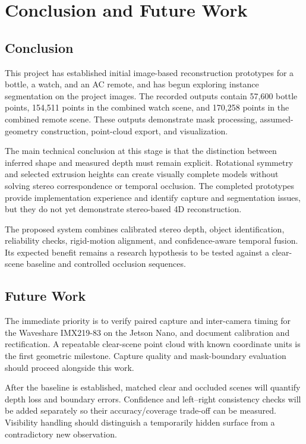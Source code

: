 \chapter{Conclusion and Future Work}
\section{Conclusion}
This project has established initial image-based reconstruction prototypes for a bottle, a watch, and an AC remote, and has begun exploring instance segmentation on the project images. The recorded outputs contain 57,600 bottle points, 154,511 points in the combined watch scene, and 170,258 points in the combined remote scene. These outputs demonstrate mask processing, assumed-geometry construction, point-cloud export, and visualization.

The main technical conclusion at this stage is that the distinction between inferred shape and measured depth must remain explicit. Rotational symmetry and selected extrusion heights can create visually complete models without solving stereo correspondence or temporal occlusion. The completed prototypes provide implementation experience and identify capture and segmentation issues, but they do not yet demonstrate stereo-based 4D reconstruction.

The proposed system combines calibrated stereo depth, object identification, reliability checks, rigid-motion alignment, and confidence-aware temporal fusion. Its expected benefit remains a research hypothesis to be tested against a clear-scene baseline and controlled occlusion sequences.

\section{Future Work}
The immediate priority is to verify paired capture and inter-camera timing for the Waveshare IMX219-83 on the Jetson Nano, and document calibration and rectification. A repeatable clear-scene point cloud with known coordinate units is the first geometric milestone. Capture quality and mask-boundary evaluation should proceed alongside this work.

After the baseline is established, matched clear and occluded scenes will quantify depth loss and boundary errors. Confidence and left--right consistency checks will be added separately so their accuracy/coverage trade-off can be measured. Visibility handling should distinguish a temporarily hidden surface from a contradictory new observation.

